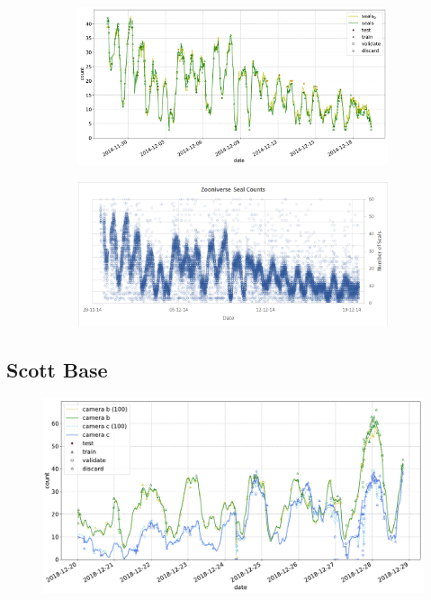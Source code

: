 \begin{figure}[ht]
    \centering
    
    \begin{subfigure}[t]{1.0\linewidth}
    \includegraphics[width=1.0\linewidth]{charts/seals/seals_combined.pdf}
    \caption{}
    \label{fig:turtle_rock}
    \end{subfigure}
    
    
    \begin{subfigure}[t]{1.0\linewidth}
    \includegraphics[width=1.0\linewidth]{figures/annotation/zooniverse.png}
    \caption{}
    \label{fig:zooniverse}
    \end{subfigure}
    
    \caption{}
    \label{fig:seals_timeseries}
\end{figure}


\subsection{Scott Base \cite{Eisert2019}}

\begin{figure}[ht]
    \centering
    \includegraphics[width=1.0\linewidth]{charts/seals/scott_base_combined.pdf}
    \caption{}
    \label{fig:scott_base}
\end{figure}
